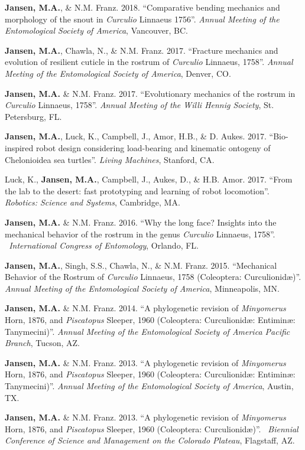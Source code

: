 \documentclass[12pt,a4paper]{article}
\begin{document}
\begin{description}
		\item \textbf{Jansen, M.A.}, \& N.M. Franz. 2018. ``Comparative bending mechanics and morphology of the snout in \textit{Curculio} Linnaeus 1756''. \textit{Annual Meeting of the Entomological Society of America}, Vancouver, BC.
		\item \textbf{Jansen, M.A.}, Chawla, N., \& N.M. Franz. 2017. ``Fracture mechanics and evolution of resilient cuticle in the rostrum of \textit{Curculio} Linnaeus, 1758''. \textit{Annual Meeting of the Entomological Society of America}, Denver, CO.
		\item \textbf{Jansen, M.A.} \& N.M. Franz. 2017. ``Evolutionary mechanics of the rostrum in \textit{Curculio} Linnaeus, 1758''. \textit{Annual Meeting of the Willi Hennig Society}, St. Petersburg, FL.
		\item \textbf{Jansen, M.A.}, Luck, K., Campbell, J., Amor, H.B., \& D. Aukes. 2017. ``Bio-inspired robot design considering load-bearing and kinematic ontogeny of Chelonioidea sea turtles''. \textit{Living Machines}, Stanford, CA.
		\item Luck, K., \textbf{Jansen, M.A.}, Campbell, J., Aukes, D., \& H.B. Amor. 2017. ``From the lab to the desert: fast prototyping and learning of robot locomotion''. \textit{Robotics: Science and Systems}, Cambridge, MA.
		\item \textbf{Jansen, M.A.} \& N.M. Franz. 2016. ``Why the long face? Insights into the mechanical behavior of the rostrum in the genus \textit{Curculio} Linnaeus, 1758''. \textit{~International Congress of Entomology}, Orlando, FL.
		\item \textbf{Jansen, M.A.}, Singh, S.S., Chawla, N., \& N.M. Franz. 2015. ``Mechanical Behavior of the Rostrum of \textit{Curculio} Linnaeus, 1758 (Coleoptera: Curculionid\ae)''. \textit{Annual Meeting of the Entomological Society of America}, Minneapolis, MN.
		\item \textbf{Jansen, M.A.} \& N.M. Franz. 2014. ``A phylogenetic revision of \textit{Minyomerus} Horn, 1876, and \textit{Piscatopus} Sleeper, 1960 (Coleoptera: Curculionid\ae: Entimin\ae: Tanymecini)''. \textit{Annual Meeting of the Entomological Society of America Pacific Branch}, Tucson, AZ.
		\item \textbf{Jansen, M.A.} \& N.M. Franz. 2013. ``A phylogenetic revision of \textit{Minyomerus} Horn, 1876, and \textit{Piscatopus} Sleeper, 1960 (Coleoptera: Curculionid\ae: Entimin\ae: Tanymecini)''. \textit{Annual Meeting of the Entomological Society of America}, Austin, TX.
		\item \textbf{Jansen, M.A.} \& N.M. Franz. 2013. ``A phylogenetic revision of \textit{Minyomerus} Horn, 1876, and \textit{Piscatopus} Sleeper, 1960 (Coleoptera: Curculionid\ae)''. \textit{~Biennial Conference of Science and Management on the Colorado Plateau}, Flagstaff, AZ.
	\end{description}
\end{document}

